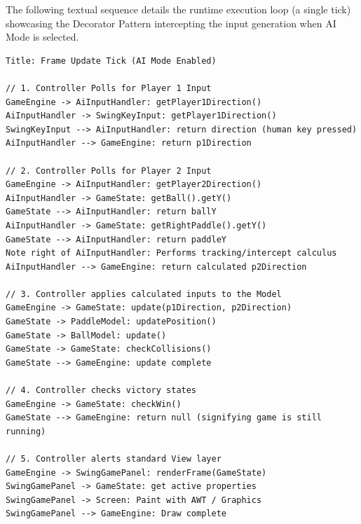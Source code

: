 \documentclass[12pt, a4paper]{article}
\begin{document}
The following textual sequence details the runtime execution loop (a single tick) showcasing the Decorator Pattern intercepting the input generation when AI Mode is selected.

\vspace{1em}
\begin{verbatim}
Title: Frame Update Tick (AI Mode Enabled)

// 1. Controller Polls for Player 1 Input
GameEngine -> AiInputHandler: getPlayer1Direction()
AiInputHandler -> SwingKeyInput: getPlayer1Direction()
SwingKeyInput --> AiInputHandler: return direction (human key pressed)
AiInputHandler --> GameEngine: return p1Direction

// 2. Controller Polls for Player 2 Input
GameEngine -> AiInputHandler: getPlayer2Direction()
AiInputHandler -> GameState: getBall().getY()
GameState --> AiInputHandler: return ballY
AiInputHandler -> GameState: getRightPaddle().getY()
GameState --> AiInputHandler: return paddleY
Note right of AiInputHandler: Performs tracking/intercept calculus
AiInputHandler --> GameEngine: return calculated p2Direction

// 3. Controller applies calculated inputs to the Model
GameEngine -> GameState: update(p1Direction, p2Direction)
GameState -> PaddleModel: updatePosition()
GameState -> BallModel: update()
GameState -> GameState: checkCollisions()
GameState --> GameEngine: update complete

// 4. Controller checks victory states
GameEngine -> GameState: checkWin()
GameState --> GameEngine: return null (signifying game is still running)

// 5. Controller alerts standard View layer
GameEngine -> SwingGamePanel: renderFrame(GameState)
SwingGamePanel -> GameState: get active properties
SwingGamePanel -> Screen: Paint with AWT / Graphics
SwingGamePanel --> GameEngine: Draw complete
\end{verbatim}
\end{document}
